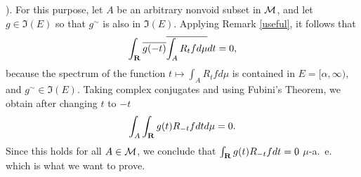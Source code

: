 \cite[(39.8)(c)]{hr2}).
For this purpose,
let $A$ be an arbitrary nonvoid subset in ${\cal M}$, and let  
$g\in \Im(E)$ so that $g^\sim$ is also in $\Im(E)$.
Applying Remark \ref{useful}, it follows that 
$$\int_\R \overline{g(-t)}\overline{
\int_A R_tfd\mu } dt=0,$$
because the spectrum of the function 
$t\mapsto \int_A R_t f d\mu$ is contained
in $ E=[\alpha ,\infty)$,
and $g^\sim \in \Im(E)$.
Taking complex conjugates and using
Fubini's Theorem, we obtain after changing $t$ to $-t$ 
$$\int_A
\int_\R g(t) R_{-t}f dtd\mu=0.$$
Since this holds for all $A\in{\cal M}$, we conclude that
$
\int_\R g(t) R_{-t}f dt=0$
$\mu$-a.\ e.
which is what we want to prove.

